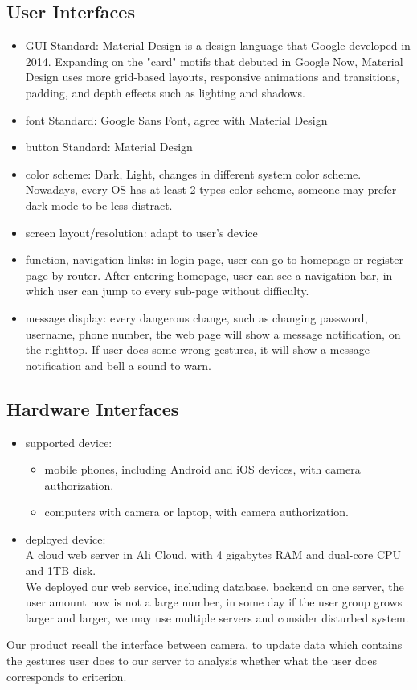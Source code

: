 \documentclass[16pt]{scrreprt}
\begin{document}
\subsection{User Interfaces}
\begin{itemize}
    \item GUI Standard: Material Design is a design language that Google developed in 2014. Expanding on the "card" motifs that debuted in Google Now, Material Design uses more grid-based layouts, responsive animations and transitions, padding, and depth effects such as lighting and shadows.
    \item font Standard: Google Sans Font, agree with Material Design
    \item button Standard: Material Design
    \item color scheme: Dark, Light, changes in different system color scheme. Nowadays, every OS has at least 2 types color scheme, someone may prefer dark mode to be less distract.
    \item screen layout/resolution: adapt to user's device
    \item function, navigation links: in login page, user can go to homepage or register page by router. After entering homepage, user can see a navigation bar, in which user can jump to every sub-page without difficulty.
    \item message display: every dangerous change, such as changing password, username, phone number, the web page will show a message notification, on the righttop. If user does some wrong gestures, it will show a message notification and bell a sound to warn.
\end{itemize}
\subsection{Hardware Interfaces}
\begin{itemize}
    \item supported device:\\
        \begin{itemize}
            \item mobile phones, including Android and iOS devices, with camera authorization.
            \item computers with camera or laptop, with camera authorization.
        \end{itemize}

    \item deployed device:\\
        A cloud web server in Ali Cloud, with 4 gigabytes RAM and dual-core CPU and 1TB disk.\\
        We deployed our web service, including database, backend on one server, the user amount now is not a large number, in some day if the user group grows larger and larger, we may use multiple servers and consider disturbed system.  
\end{itemize}
    Our product recall the interface between camera, to update data which contains the gestures user does to our server to analysis whether what the user does corresponds to criterion.
\end{document}
